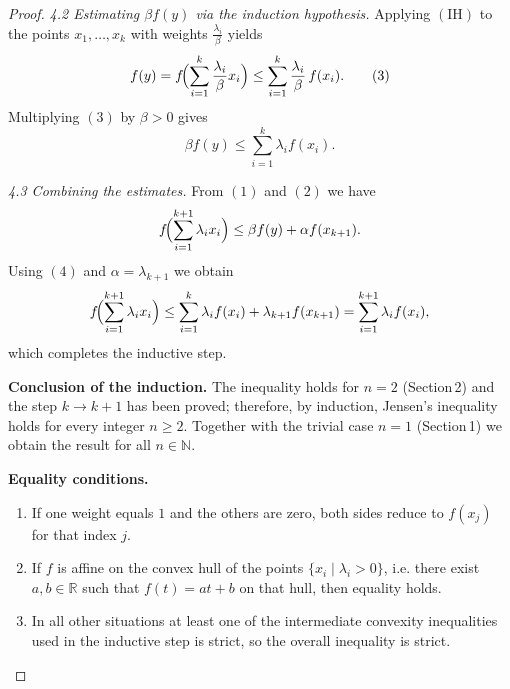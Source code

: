 \begin{proof}
\smallskip
\emph{4.2 Estimating \(\beta f(y)\) via the induction hypothesis.}  
Applying \((\text{IH})\) to the points \(x_{1},\dots ,x_{k}\) with weights
\(\frac{\lambda_{i}}{\beta}\) yields
\begin{equation}
f(y)=f\!\Bigl(\sum_{i=1}^{k}\frac{\lambda_{i}}{\beta}x_{i}\Bigr)
     \le\sum_{i=1}^{k}\frac{\lambda_{i}}{\beta}\,f(x_{i}). \tag{3}
\end{equation}
Multiplying \((3)\) by \(\beta>0\) gives
\begin{equation}
\beta f(y)\le\sum_{i=1}^{k}\lambda_{i}f(x_{i}). \tag{4}
\end{equation}

\smallskip
\emph{4.3 Combining the estimates.}  
From \((1)\) and \((2)\) we have
\[
f\!\Bigl(\sum_{i=1}^{k+1}\lambda_{i}x_{i}\Bigr)
   \le \beta f(y)+\alpha f(x_{k+1}).
\]
Using \((4)\) and \(\alpha=\lambda_{k+1}\) we obtain
\[
f\!\Bigl(\sum_{i=1}^{k+1}\lambda_{i}x_{i}\Bigr)
   \le \sum_{i=1}^{k}\lambda_{i}f(x_{i})+\lambda_{k+1}f(x_{k+1})
   =\sum_{i=1}^{k+1}\lambda_{i}f(x_{i}),
\]
which completes the inductive step.

\medskip
\textbf{Conclusion of the induction.}  
The inequality holds for \(n=2\) (Section 2) and the step \(k\to k+1\) has been proved; therefore, by induction, Jensen’s inequality holds for every integer \(n\ge2\).  Together with the trivial case \(n=1\) (Section 1) we obtain the result for all \(n\in\mathbb N\).

\medskip
\textbf{Equality conditions.}\\[4pt]
\begin{enumerate}
\item If one weight equals \(1\) and the others are zero, both sides reduce to \(f(x_{j})\) for that index \(j\).
\item If \(f\) is affine on the convex hull of the points \(\{x_{i}\mid\lambda_{i}>0\}\), i.e. there exist \(a,b\in\mathbb R\) such that \(f(t)=at+b\) on that hull, then equality holds.
\item In all other situations at least one of the intermediate convexity inequalities used in the inductive step is strict, so the overall inequality is strict.
\end{enumerate}
\end{proof}